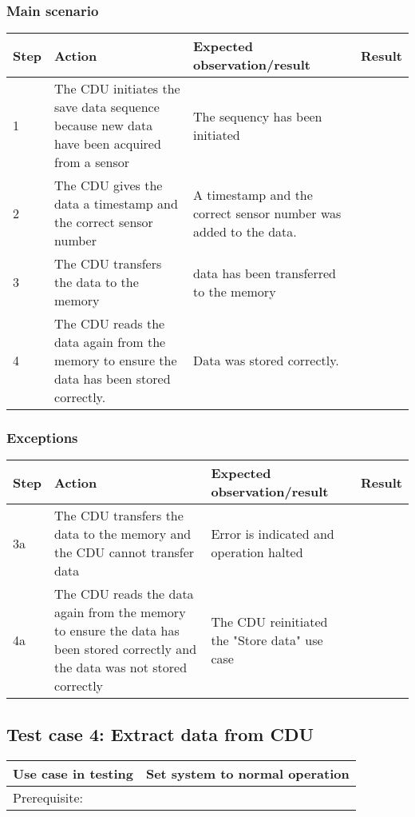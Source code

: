 \subsubsection{Main scenario}
\begin{table}[H]
    \begin{tabular}{|l|p{7cm}|p{5cm}|l|}
    \hline
    Step & Action & Expected observation/result & Result \\ \hline
    1 & The CDU initiates the save data sequence because new data have been acquired from a sensor & The sequency has been initiated & ~ \\ \hline
    2 & The CDU gives the data a timestamp and the correct sensor number & A timestamp and the correct sensor number was added to the data. & ~ \\ \hline
    3 & The CDU transfers the data to the memory & data has been transferred to the memory & ~ \\ \hline
    4 & The CDU reads the data again from the memory to ensure the data has been stored correctly. & Data was stored correctly. & ~ \\ \hline
    \end{tabular}
\end{table}

\subsubsection{Exceptions}
\begin{table}[H]
    \begin{tabular}{|l|p{7cm}|p{5cm}|l|}
    \hline
    Step & Action & Expected observation/result & Result \\ \hline
    3a & The CDU transfers the data to the memory and the CDU cannot transfer data & Error is indicated and operation halted & ~ \\ \hline
    4a & The CDU reads the data again from the memory to ensure the data has been stored correctly and the data was not stored correctly & The CDU reinitiated the "Store data" use case & ~ \\ \hline
    \end{tabular}
\end{table}

\subsection{Test case 4: Extract data from CDU}
\begin{table}[H]
    \begin{tabular}{|l|p{7cm}|}
    \hline
    Use case in testing & Set system to normal operation \\ \hline
    Prerequisite: & ~ \\ \hline
    \end{tabular}
\end{table}

